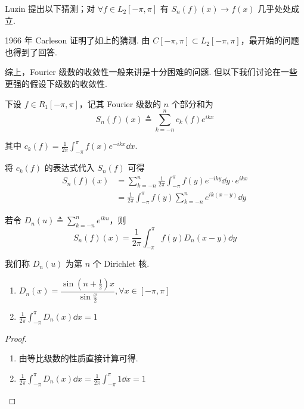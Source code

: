 Luzin 提出以下猜测；对 $\forall f\in L_2[-\pi,\pi]$ 有 $S_n(f)(x)\to f(x)$ 几乎处处成立.

1966 年 Carleson 证明了如上的猜测. 由 $C[-\pi,\pi]\subset L_2[-\pi,\pi]$，最开始的问题也得到了回答.

综上，Fourier 级数的收敛性一般来讲是十分困难的问题. 但以下我们讨论在一些更强的假设下级数的收敛性.


下设 $f\in R_1[-\pi,\pi]$，记其 Fourier 级数的 $n$ 个部分和为
$$
S_n(f)(x)\triangleq\sum_{k=-n}^nc_k(f)e^{ikx}
$$

其中 $c_k(f)=\displaystyle\frac{1}{2\pi}\int_{-\pi}^{\pi}f(x)e^{-ikx}\dd x$.

将 $c_k(f)$ 的表达式代入 $S_n(f)$ 可得
$$
\begin{aligned}
    S_n(f)(x)&=\sum_{k=-n}^n\frac{1}{2\pi}\int_{-\pi}^{\pi}f(y)e^{-iky}\dd y\cdot e^{ikx}\\
    &=\frac{1}{2\pi}\int_{-\pi}^{\pi}f(y)\sum_{k=-n}^ne^{ik(x-y)}\dd y
\end{aligned}
$$

若令 $D_n(u)\triangleq\displaystyle\sum_{k=-n}^ne^{iku}$，则
$$
S_n(f)(x)=\frac{1}{2\pi}\int_{-\pi}^{\pi}f(y)D_n(x-y)\dd y
$$

我们称 $D_n(u)$ 为第 $n$ 个 Dirichlet 核.

\begin{property}
    \begin{enumerate}
        \item $D_n(x)=\dfrac{\sin\left(n+\frac{1}{2}\right)x}{\sin\frac{x}{2}},\forall x\in[-\pi,\pi]$
        
        \item $\displaystyle\frac{1}{2\pi}\int_{-\pi}^{\pi}D_n(x)\dd x=1$
    \end{enumerate}
\end{property}
\begin{proof}
    \begin{enumerate}
        \item 由等比级数的性质直接计算可得.
        
        \item $\displaystyle\frac{1}{2\pi}\int_{-\pi}^{\pi}D_n(x)\dd x=\frac{1}{2\pi}\int_{-\pi}^{\pi}1\dd x=1$
    \end{enumerate}
\end{proof}

